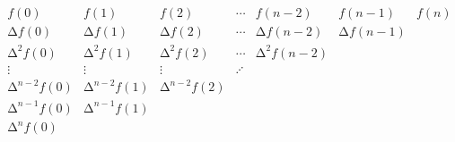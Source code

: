 \documentclass[../libro.tex]{subfiles}
\begin{document}
\begin{align*}
    \begin{matrix}
        f(0)                  & f(1)                  & f(2)                  & \cdots  & f(n-2)              & f(n-1)            & f(n) \\
        \increment f(0)       & \increment f(1)       & \increment f(2)       & \cdots  & \increment f(n-2)   & \increment f(n-1) & {}   \\
        \increment^2 f(0)     & \increment^2 f(1)     & \increment^2 f(2)     & \cdots  & \increment^2 f(n-2) & {}                & {}   \\
        \vdots                & \vdots                & \vdots                & \iddots & {}                  & {}                & {}   \\
        \increment^{n-2} f(0) & \increment^{n-2} f(1) & \increment^{n-2} f(2) & {}      & {}                  & {}                & {}   \\
        \increment^{n-1} f(0) & \increment^{n-1} f(1) & {}                    & {}      & {}                  & {}                & {}   \\
        \increment^{n} f(0)   & {}                    & {}                    & {}      & {}                  & {}                & {}   \\
    \end{matrix}
\end{align*}
\end{document}
